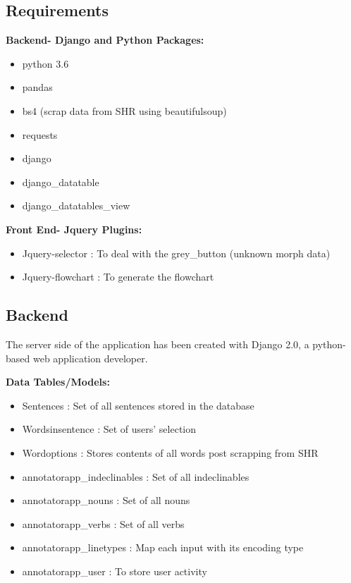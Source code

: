 \documentclass[12pt]{article}
\begin{document}
\subsection{Requirements}
\textbf{Backend- Django and Python Packages:}
\begin{itemize}
	\item python 3.6
	\item pandas
	\item bs4 (scrap data from SHR using beautifulsoup)
	\item requests
	\item django
	\item django\_datatable
	\item django\_datatables\_view
\end{itemize}
\textbf{Front End- Jquery Plugins:}
\begin{itemize}
	\item Jquery-selector : To deal with the grey\_button (unknown morph data)
	\item Jquery-flowchart : To generate the flowchart
\end{itemize}

\subsection{Backend}
The server side of the application has been created with Django 2.0, a python-based web application developer.

\textbf{Data Tables/Models:}
\begin{itemize}
	\item Sentences : Set of all sentences stored in the database
	\item Wordsinsentence : Set of users' selection
	\item Wordoptions : Stores contents of all words post scrapping from SHR
	\item annotatorapp\_indeclinables : Set of all indeclinables
	\item annotatorapp\_nouns : Set of all nouns
	\item annotatorapp\_verbs : Set of all verbs
	\item annotatorapp\_linetypes : Map each input with its encoding type
	\item annotatorapp\_user : To store user activity 
\end{itemize}
\end{document}
